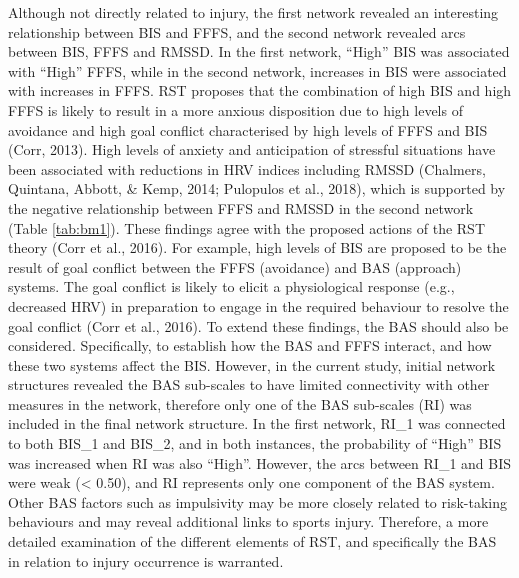 \documentclass[
  english,
  man,floatsintext]{apa6}
\begin{document}
Although not directly related to injury, the first network revealed an interesting relationship between BIS and FFFS, and the second network revealed arcs between BIS, FFFS and RMSSD.
In the first network, \enquote{High} BIS was associated with \enquote{High} FFFS, while in the second network, increases in BIS were associated with increases in FFFS.
RST proposes that the combination of high BIS and high FFFS is likely to result in a more anxious disposition due to high levels of avoidance and high goal conflict characterised by high levels of FFFS and BIS (Corr, 2013).
High levels of anxiety and anticipation of stressful situations have been associated with reductions in HRV indices including RMSSD (Chalmers, Quintana, Abbott, \& Kemp, 2014; Pulopulos et al., 2018), which is supported by the negative relationship between FFFS and RMSSD in the second network (Table \ref{tab:bm1}).
These findings agree with the proposed actions of the RST theory (Corr et al., 2016).
For example, high levels of BIS are proposed to be the result of goal conflict between the FFFS (avoidance) and BAS (approach) systems.
The goal conflict is likely to elicit a physiological response (e.g., decreased HRV) in preparation to engage in the required behaviour to resolve the goal conflict (Corr et al., 2016).
To extend these findings, the BAS should also be considered.
Specifically, to establish how the BAS and FFFS interact, and how these two systems affect the BIS.
However, in the current study, initial network structures revealed the BAS sub-scales to have limited connectivity with other measures in the network, therefore only one of the BAS sub-scales (RI) was included in the final network structure.
In the first network, RI\_1 was connected to both BIS\_1 and BIS\_2, and in both instances, the probability of \enquote{High} BIS was increased when RI was also \enquote{High}.
However, the arcs between RI\_1 and BIS were weak (\textless{} 0.50), and RI represents only one component of the BAS system.
Other BAS factors such as impulsivity may be more closely related to risk-taking behaviours and may reveal additional links to sports injury.
Therefore, a more detailed examination of the different elements of RST, and specifically the BAS in relation to injury occurrence is warranted.
\end{document}
